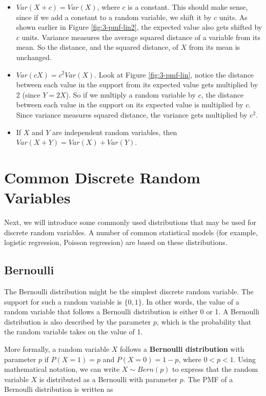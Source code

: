 \documentclass[
]{book}
\providecommand{\tightlist}{%
  \setlength{\itemsep}{0pt}\setlength{\parskip}{0pt}}
\begin{document}
\begin{itemize}
\tightlist
\item
  \(Var(X+c) = Var(X)\), where \(c\) is a constant. This should make sense, since if we add a constant to a random variable, we shift it by \(c\) units. As shown earlier in Figure \ref{fig:3-pmf-lin2}, the expected value also gets shifted by \(c\) units. Variance measures the average squared distance of a variable from its mean. So the distance, and the squared distance, of \(X\) from its mean is unchanged.
\item
  \(Var(cX) = c^2 Var(X)\). Look at Figure \ref{fig:3-pmf-lin}, notice the distance between each value in the support from its expected value gets multiplied by 2 (since \(Y=2X\)). So if we multiply a random variable by \(c\), the distance between each value in the support on its expected value is multiplied by \(c\). Since variance measures squared distance, the variance gets multiplied by \(c^2\).
\item
  If \(X\) and \(Y\) are independent random variables, then \(Var(X+Y) = Var(X) + Var(Y)\).
\end{itemize}

\section{Common Discrete Random Variables}\label{common-discrete-random-variables}

Next, we will introduce some commonly used distributions that may be used for discrete random variables. A number of common statistical models (for example, logistic regression, Poisson regression) are based on these distributions.

\subsection{Bernoulli}\label{bernoulli}

The Bernoulli distribution might be the simplest discrete random variable. The support for such a random variable is \(\{0,1\}\). In other words, the value of a random variable that follows a Bernoulli distribution is either 0 or 1. A Bernoulli distribution is also described by the parameter \(p\), which is the probability that the random variable takes on the value of 1.

More formally, a random variable \(X\) follows a \textbf{Bernoulli distribution} with parameter \(p\) if \(P(X=1) = p\) and \(P(X=0) = 1-p\), where \(0<p<1\). Using mathematical notation, we can write \(X \sim Bern(p)\) to express that the random variable \(X\) is distributed as a Bernoulli with parameter \(p\). The PMF of a Bernoulli distribution is written as
\end{document}
